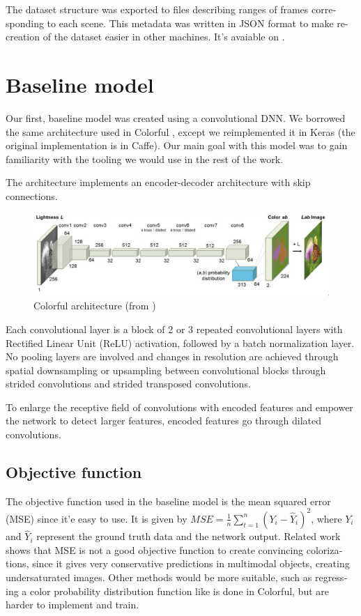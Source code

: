 \documentclass[12pt,openright,twoside,a4paper,english]{abntex2}
\begin{document}
\begin{otherlanguage}{english}
The dataset structure was exported to files describing ranges of frames corresponding to each scene. This metadata was written in JSON format to make re-creation of the dataset easier in other machines. It's avaiable on \cite{colormotion_dataset}.

\section{Baseline model}

Our first, baseline model was created using a convolutional DNN. We borrowed the same architecture used in Colorful \cite{colorful}, except we reimplemented it in Keras (the original implementation is in Caffe). Our main goal with this model was to gain familiarity with the tooling we would use in the rest of the work.

The architecture implements an encoder-decoder architecture with skip connections.

\begin{figure}[!htb]
\centering
\includegraphics[width=\textwidth]{Colorful}
\caption{Colorful architecture (from \cite{colorful})}
\label{colorful_architecture_paper}
\end{figure}

Each convolutional layer is a block of 2 or 3 repeated convolutional layers with Rectified Linear Unit (ReLU) activation, followed by a batch normalization layer. No pooling layers are involved and changes in resolution are achieved through spatial downsampling or upsampling between convolutional blocks through strided convolutions and strided transposed convolutions.

To enlarge the receptive field of convolutions with encoded features and empower the network to detect larger features, encoded features go through dilated convolutions.

\subsection{Objective function}

The objective function used in the baseline model is the mean squared error (MSE) since it'e easy to use. It is given by $MSE = \frac{1}{n}\sum_{t=1}^{n}(Y_i - \hat{Y}_i)^2$, where $Y_i$ and $\hat{Y}_i$ represent the ground truth data and the network output. Related work \cite{colorful} shows that MSE is not a good objective function to create convincing colorizations, since it gives very conservative predictions in multimodal objects, creating undersaturated images. Other methods would be more suitable, such as regressing a color probability distribution function like is done in Colorful, but are harder to implement and train.


\end{otherlanguage}
\end{document}
